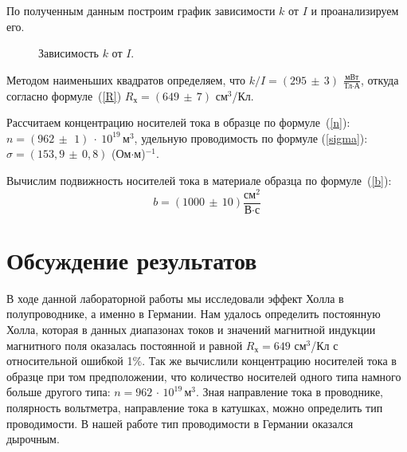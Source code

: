\documentclass[a4paper,12pt]{article} %
\begin{document}
	По полученным данным построим график зависимости $k$ от $I$ и проанализируем его.
	\begin{figure}[H]
		\caption{Зависимость $k$ от $I$.}
		\label{ris:k=k(I)}
	\end{figure}


	Методом наименьших квадратов определяем, что $k/I = (295\,\pm\,3)$ $\frac{\text{мВт}}{\text{Тл}\cdot\text{А}}$, откуда согласно формуле~(\ref{R}) $R_\text{х} = (649\,\pm\,7)$ см$^3$/Кл.
	
	Рассчитаем концентрацию носителей тока в образце по формуле~(\ref{n}): $n = (962\,\pm~\,1)~\cdot~10^{19}\,\text{м}^3$, удельную проводимость по формуле (\ref{sigma}): $\sigma = (153,9\,\pm\, 0,8)$ (Ом$\cdot$м)$^{-1}$.
	 
	Вычислим подвижность носителей тока в материале образца по формуле~(\ref{b}):
	 \[
	\boxed{b = (1000\,\pm\, 10) \frac{\text{см}^2}{\text{В}\cdot\text{с}}}
	\]
\section {Обсуждение результатов}
	В ходе данной лабораторной работы мы исследовали эффект Холла в полупроводнике, а именно в Германии. Нам удалось определить постоянную Холла, которая в данных диапазонах токов и значений магнитной индукции магнитного поля оказалась постоянной и равной $R_\text{х} = 649$ см$^3$/Кл с относительной ошибкой 1\%. Так же вычислили концентрацию носителей тока в образце при том предположении, что количество носителей одного типа намного больше другого типа: $n = 962\, \cdot \, 10^{19}\,\text{м}^3$. Зная направление тока в проводнике, полярность вольтметра, направление тока в катушках, можно определить тип проводимости. В нашей работе тип проводимости в Германии оказался дырочным.
	
\end{document}
